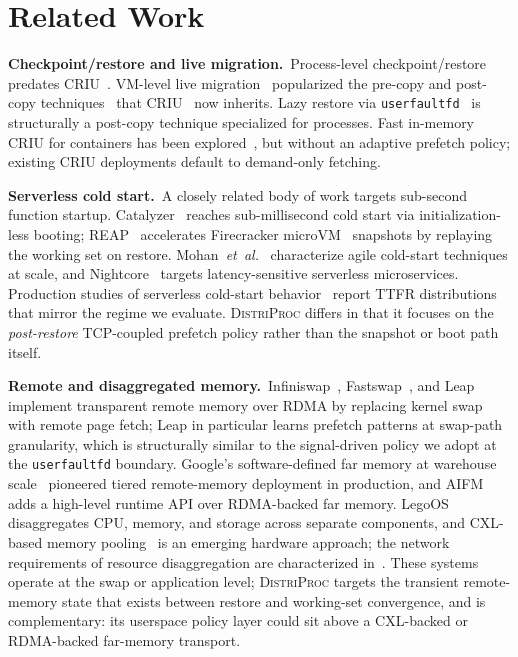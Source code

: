 \documentclass[journal]{IEEEtran}
\newcommand{\distriproc}{\textsc{DistriProc}\xspace}
\newcommand{\uffd}{\texttt{userfaultfd}\xspace}
\begin{document}
\section{Related Work}
\label{sec:related}

\textbf{Checkpoint/restore and live migration.}\, Process-level
checkpoint/restore predates CRIU~\cite{litzkow1997checkpoint,
sapuntzakis2002optimizing}. VM-level live
migration~\cite{clark2005live} popularized the pre-copy and post-copy
techniques~\cite{hines2009postcopy} that CRIU~\cite{criu} now inherits.
Lazy restore via \uffd~\cite{criu-lazy} is structurally a post-copy technique
specialized for processes. Fast in-memory CRIU for containers has been
explored~\cite{venkatesh2019fast}, but without an adaptive prefetch policy;
existing CRIU deployments default to demand-only fetching.

\textbf{Serverless cold start.}\, A closely related body of work targets
sub-second function startup. Catalyzer~\cite{du2020catalyzer} reaches
sub-millisecond cold start via initialization-less booting;
REAP~\cite{ustiugov2021reap} accelerates Firecracker microVM~\cite{agache2020firecracker}
snapshots by replaying the working set on restore.
Mohan~\textit{et~al.}~\cite{mohan2019agile} characterize agile cold-start
techniques at scale, and Nightcore~\cite{shen2021nightcore} targets
latency-sensitive serverless microservices. Production studies of serverless
cold-start behavior~\cite{wang2018peeking, shahrad2020serverless} report TTFR
distributions that mirror the regime we evaluate. \distriproc differs in
that it focuses on the \emph{post-restore} TCP-coupled prefetch policy rather
than the snapshot or boot path itself.

\textbf{Remote and disaggregated memory.}\,
Infiniswap~\cite{gu2017infiniswap}, Fastswap~\cite{amaro2020can}, and
Leap~\cite{al2020leap} implement transparent remote memory over RDMA by
replacing kernel swap with remote page fetch; Leap in particular learns
prefetch patterns at swap-path granularity, which is structurally similar
to the signal-driven policy we adopt at the \uffd boundary.
Google's software-defined far memory at warehouse
scale~\cite{lagar2019software} pioneered tiered remote-memory deployment
in production, and AIFM~\cite{ruan2020aifm} adds a high-level runtime API
over RDMA-backed far memory. LegoOS~\cite{shan2018legoos} disaggregates CPU,
memory, and storage across separate components, and CXL-based memory
pooling~\cite{cxl} is an emerging hardware approach; the network
requirements of resource disaggregation are characterized
in~\cite{gao2016network}. These systems operate at the swap or
application level; \distriproc targets the transient remote-memory state
that exists between restore and working-set convergence, and is
complementary: its userspace policy layer could sit above a CXL-backed
or RDMA-backed far-memory transport.
\end{document}
